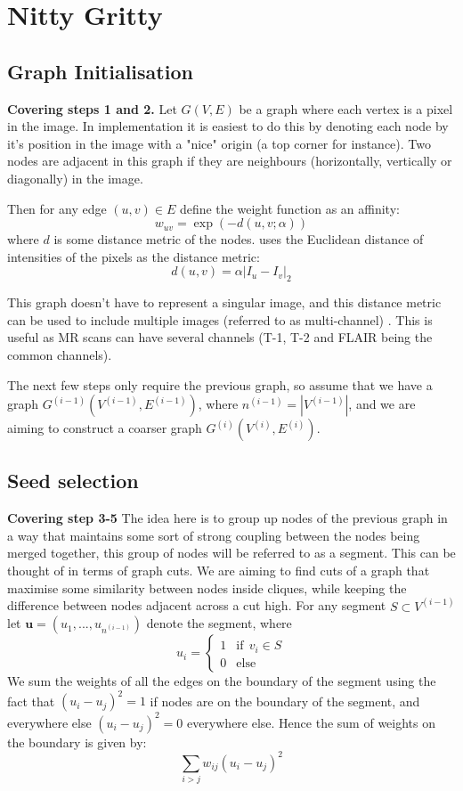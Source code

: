 \documentclass{report}
\begin{document}
\section{Nitty Gritty}
\subsection{Graph Initialisation}
\textbf{Covering steps 1 and 2.}
Let $G(V, E)$ be a graph where each vertex is a pixel in the image. In implementation it is easiest to do this by denoting each node by it's position in the image with a "nice" origin (a top corner for instance). Two nodes are adjacent in this graph if they are neighbours (horizontally, vertically or diagonally) in the image.
 
Then for any edge $(u,v)\in E$ define the weight function as an affinity: 
\[w_{uv} = \exp{(-d(u,v; \alpha))}\]
where $d$ is some distance metric of the nodes. \cite{galun_sharon_basri_brandt_2003} uses the Euclidean distance of intensities of the pixels as the distance metric: 
\[d(u,v) = \alpha|I_u - I_v|_2\]

This graph doesn't have to represent a singular image, and this distance metric can be used to include multiple images (referred to as multi-channel) \cite{akselrod-ballin_galun_gomori_filippi_valsasina_basri_brandt_2009}. This is useful as MR scans can have several channels (T-1, T-2 and FLAIR being the common channels). 

The next few steps only require the previous graph, so assume that we have a graph $G^{(i-1)}(V^{(i-1)}, E^{(i-1)})$, where $n^{(i-1)} = |V^{(i-1)}|$, and we are aiming to construct a coarser graph $G^{(i)}(V^{(i)}, E^{(i)})$.

\subsection{Seed selection}

\textbf{Covering step 3-5}
The idea here is to group up nodes of the previous graph in a way that maintains some sort of strong coupling between the nodes being merged together, this group of nodes will be referred to as a segment. This can be thought of in terms of graph cuts. We are aiming to find cuts of a graph that maximise some similarity between nodes inside cliques, while keeping the difference between nodes adjacent across a cut high. For any segment $S \subset V^{(i-1)}$ let $\mathbf{u} = (u_1, ..., u_{n^{(i-1)}})$ denote the segment, where 
\begin{equation*}
u_i = \begin{cases} 1 & \text{if}\: \: v_i \in S \\
0 & \text{else}
\end{cases}
\end{equation*}
We sum the weights of all the edges on the boundary of the segment using the fact that $(u_i - u_j)^2 = 1$ if nodes are on the boundary of the segment, and everywhere else $(u_i - u_j)^2 = 0$ everywhere else. Hence the sum of weights on the boundary is given by: 
\[
\sum_{i>j} w_{ij}(u_i - u_j)^2
\]
\end{document}
